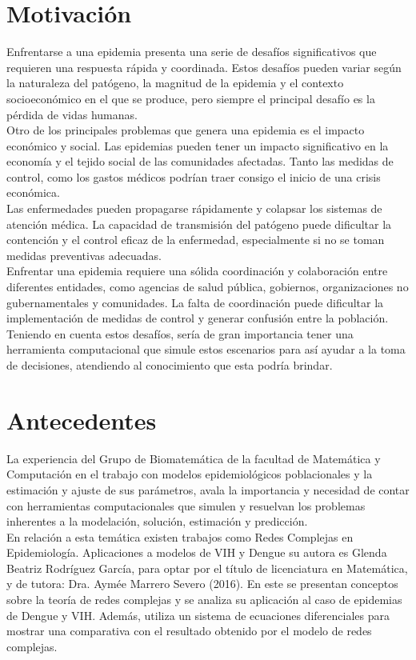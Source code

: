 \section{Motivación}
Enfrentarse a una epidemia presenta una serie de desafíos significativos que requieren 
una respuesta rápida y coordinada. Estos desafíos pueden variar según la naturaleza del 
patógeno, la magnitud de la epidemia y el contexto socioeconómico en el que se produce, 
pero siempre el principal desafío es la pérdida de vidas humanas.\\
Otro de los principales problemas que genera una epidemia es el impacto económico y social. 
Las epidemias pueden tener un impacto significativo en la economía y el tejido social 
de las comunidades afectadas. Tanto las medidas de control, como los gastos médicos podrían 
traer consigo el inicio de una crisis económica.\\
Las enfermedades pueden propagarse rápidamente y colapsar los sistemas de atención 
médica. La capacidad de transmisión del patógeno puede dificultar la contención y el control 
eficaz de la enfermedad, especialmente si no se toman medidas preventivas adecuadas.\\
Enfrentar una epidemia requiere una sólida coordinación y colaboración entre diferentes 
entidades, como agencias de salud pública, gobiernos, organizaciones no gubernamentales y 
comunidades. La falta de coordinación puede dificultar la implementación de medidas de 
control y generar confusión entre la población.\\
Teniendo en cuenta estos desafíos, sería de gran importancia tener una herramienta 
computacional que simule estos escenarios para así ayudar a la toma de decisiones, atendiendo 
al conocimiento que esta podría brindar.\\

\section{Antecedentes}
La experiencia del Grupo de Biomatemática de la facultad de Matemática y Computación en el trabajo 
con modelos epidemiológicos poblacionales y la estimación y ajuste de sus parámetros, avala la 
importancia y necesidad de contar con herramientas computacionales que simulen y resuelvan los problemas 
inherentes a la modelación, solución, estimación y predicción.\\
En relación a esta temática existen trabajos como Redes Complejas en Epidemiología. Aplicaciones a 
modelos de VIH y Dengue su autora es Glenda Beatriz Rodríguez García, para optar por el título 
de licenciatura en Matemática, y de tutora: Dra. Aymée Marrero Severo (2016). En este se presentan
conceptos sobre la teoría de redes complejas y se analiza su aplicación al caso de epidemias de Dengue
y VIH. Además, utiliza un sistema de ecuaciones diferenciales para mostrar una comparativa con el 
resultado obtenido por el modelo de redes complejas.\\ 

